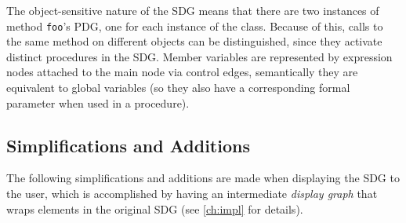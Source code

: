 The object-sensitive nature of the SDG means that there are two instances of method \lstinline|foo|'s PDG, one for each 
instance of the class. Because of this, calls to the same method on different objects can be distinguished, since they 
activate distinct procedures in the SDG. Member variables are represented by expression nodes attached to the main node 
via control edges, semantically they are equivalent to global variables (so they also have a corresponding formal 
parameter when used in a procedure).



\subsection{Simplifications and Additions}

The following simplifications and additions are made when displaying the SDG to the user, which is accomplished by 
having an intermediate \emph{display graph} that wraps elements in the original SDG (see \autoref{ch:impl} for details).

